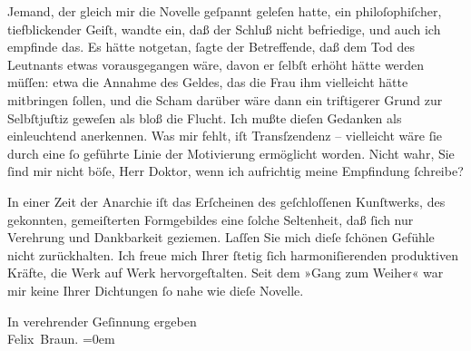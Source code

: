 \pstart
           Jemand, der gleich mir die
                  Novelle geſpannt geleſen
               hatte, ein philoſophiſcher, tiefblickender Geiſt, wandte ein, daß der Schluß nicht
               befriedige, und auch ich empfinde das. Es hätte notgetan,{ }ſagte der Betreffende, daß dem Tod des
               Leutnants etwas vorausgegangen wäre, davon er{ }ſelbſt erhöht hätte werden müſſen: etwa
               die Annahme des Geldes, das die Frau ihm vielleicht hätte mitbringen{ }ſollen, und die
               Scham darüber wäre dann ein triftigerer Grund zur Selbſtjuſtiz geweſen als bloß die
               Flucht. Ich {\pb}mußte
               dieſen Gedanken als einleuchtend anerkennen. Was mir fehlt, iſt Transſzendenz –
               vielleicht wäre{ }ſie durch eine{ }ſo geführte Linie der Motivierung ermöglicht worden.
               Nicht wahr, Sie{ }ſind mir nicht böſe, Herr Doktor, wenn ich aufrichtig meine
               Empfindung{ }ſchreibe?\pend
           
\pstart
           In einer Zeit der Anarchie iſt das Erſcheinen des geſchloſſenen Kunſtwerks, des
               gekonnten, gemeiſterten Formgebildes eine{ }ſolche Seltenheit, daß{ }ſich nur Verehrung
               und Dankbarkeit geziemen. Laſſen Sie mich dieſe{ }ſchönen Gefühle nicht zurückhalten.
               Ich freue mich Ihrer{ }ſtetig{ }ſich harmoni{\pb}ſierenden produktiven
               Kräfte, die Werk auf Werk hervorgeſtalten. Seit dem »Gang zum Weiher« war mir keine Ihrer Dichtungen{ }ſo nahe wie dieſe Novelle.\pend
           
\pstart
           In verehrender Geſinnung ergeben{\\[\baselineskip]}\spacefill\mbox{Felix Braun.}\pend
           \leftskip=0em{}\endnumbering{}  \newcommand{\dateiname}{L02486}\newcommand{\titel}{Felix Braun an Arthur Schnitzler, 10. 5. 1927}\newcommand{\editorInnen}{Martin Anton Müller und Gerd-Hermann Susen}
